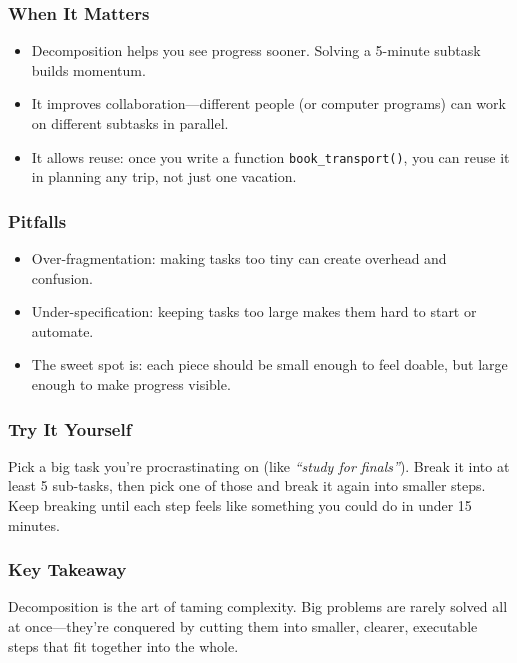 \documentclass[
  letterpaper,
  DIV=11,
  numbers=noendperiod]{scrreprt}
\providecommand{\tightlist}{%
  \setlength{\itemsep}{0pt}\setlength{\parskip}{0pt}}
\begin{document}
\subsubsection{When It Matters}\label{when-it-matters-1}

\begin{itemize}
\tightlist
\item
  Decomposition helps you see progress sooner. Solving a 5-minute
  subtask builds momentum.
\item
  It improves collaboration---different people (or computer programs)
  can work on different subtasks in parallel.
\item
  It allows reuse: once you write a function \texttt{book\_transport()},
  you can reuse it in planning any trip, not just one vacation.
\end{itemize}

\subsubsection{Pitfalls}\label{pitfalls}

\begin{itemize}
\tightlist
\item
  Over-fragmentation: making tasks too tiny can create overhead and
  confusion.
\item
  Under-specification: keeping tasks too large makes them hard to start
  or automate.
\item
  The sweet spot is: each piece should be small enough to feel doable,
  but large enough to make progress visible.
\end{itemize}

\subsubsection{Try It Yourself}\label{try-it-yourself-3}

Pick a big task you're procrastinating on (like \emph{``study for
finals''}). Break it into at least 5 sub-tasks, then pick one of those
and break it again into smaller steps. Keep breaking until each step
feels like something you could do in under 15 minutes.

\subsubsection{Key Takeaway}\label{key-takeaway-2}

Decomposition is the art of taming complexity. Big problems are rarely
solved all at once---they're conquered by cutting them into smaller,
clearer, executable steps that fit together into the whole.
\end{document}
